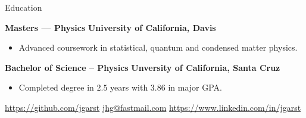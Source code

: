 \documentclass[11pt,a4paper]{article}
\newcommand{\ComputationalPhysics}{
  \href{http://young.physics.ucsc.edu/115/}{Computational Physics}
}
\newcommand{\MathematicalMethods}{
  \href{http://scipp.ucsc.edu/~haber/ph116C/}{Mathematical Methods}
}
\begin{document}
\begin{mysection}{Education}

  \begin{addmargin}[0.5em]{0em}
    {\large\bfseries Masters --- Physics}
    \hfill {\bfseries University of California, Davis}
    \begin{adjustwidth}{1ex}{0ex}

    \begin{itemize}
        [label=-, topsep=0pt, itemsep=0.5ex, parsep=0pt, leftmargin=1em]
      \item Advanced coursework in statistical, quantum and condensed matter
            physics.
    \end{itemize}
    \end{adjustwidth}
  \end{addmargin}

  \medskip

  \begin{addmargin}[0.5em]{0em}
    {\large\bfseries Bachelor of Science -- Physics}
    \hfill {\bfseries Unversity of California, Santa Cruz}
    \begin{adjustwidth}{1ex}{0ex}

   \begin{itemize}
     [label=-, topsep=0pt, itemsep=0.5ex, parsep=0pt, leftmargin=1em]
     \item Completed degree in $2.5$ years with $3.86$ in major GPA.
   \end{itemize}

    \end{adjustwidth}
  \end{addmargin}

\end{mysection}

\vfill

\begin{center}
  \href{https://github.com/jgarst}{https://github.com/jgarst}
  \textbullet{}
  \href{mailto:jhg@fastmail.com}{jhg@fastmail.com}
  \textbullet{}
  \href{https://www.linkedin.com/in/jgarst}
       {https://www.linkedin.com/in/jgarst}
\end{center}
\end{document}
